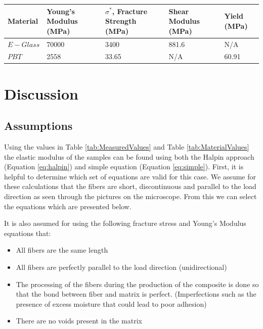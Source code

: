\documentclass[11pt]{article}
\begin{document}
\onehalfspacing
\begin{center}
 \label{tab:MaterialValues}
\begin{tabular}{p{2cm} || p{} | p{} | p{2.5cm} | p{} }
\hline
Material & Young's Modulus (MPa) & \(\sigma^*\), Fracture Strength (MPa) & Shear Modulus (MPa) & Yield (MPa)\\
\hline
\hline
\(E-Glass\) & 70000 &  3400 & 881.6 & N/A \\
\(PBT\) & 2558 & 33.65 & N/A & 60.91\\
\hline
\end{tabular}
\end{center}
\singlespacing

\section{Discussion}

\subsection{Assumptions}
Using the values in Table \ref{tab:MeasuredValues} and Table \ref{tab:MaterialValues} the elastic modulus of the samples can be found using both the Halpin approach (Equation \ref{eq:halpin}) and simple equation (Equation \ref{eq:simple}). First, it is helpful to determine which set of equations are valid for this case. We assume for these calculations that the fibers are short, discontinuous and parallel to the load direction as seen through the pictures on the microscope. From this we can select the equations which are presented below. 

It is also assumed for using the following fracture stress and Young's Modulus equations that:

\begin{itemize}
\item All fibers are the same length
\item All fibers are perfectly parallel to the load direction (unidirectional)
\item The processing of the fibers during the production of the composite is done so that the bond between fiber and matrix is perfect. (Imperfections such as the presence of excess moisture that could lead to poor adhesion)
\item There are no voids present in the matrix
\end{itemize}
\end{document}
